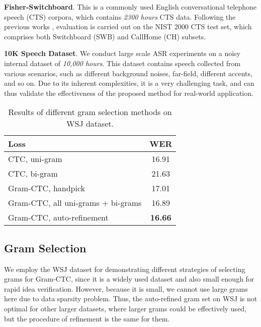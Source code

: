 \documentclass{article}
\begin{document}
{\bf Fisher-Switchboard}.  This is a commonly used English conversational telephone speech (CTS) corpora, which contains {\it 2300 hours} CTS data. Following the previous works \cite{geoffery2016ctc,povey2016purely,xiong2016achieving,sercu2016dense}, evaluation is carried out on the NIST 2000 CTS test set, which comprises both Switchboard (SWB) and CallHome (CH) subsets.

{\bf 10K Speech Dataset}. We conduct large scale ASR experiments on a noisy internal dataset of {\it 10,000 hours}. This dataset contains speech collected from various scenarios, such as different background noises, far-field, different accents, and so on. Due to its inherent complexities, it is a very challenging task, and can thus validate the effectiveness of the proposed method for real-world application.


\begin{table}[t]
\begin{center}
\begin{tabular}{l|c}
\toprule
Loss & WER \\
\midrule
CTC, uni-gram & 16.91 \\
CTC, bi-gram & 21.63 \\
\midrule
Gram-CTC, handpick & 17.01 \\
Gram-CTC, all uni-grams + bi-grams & 16.89 \\
Gram-CTC, auto-refinement & \textbf{16.66} \\
\bottomrule
\end{tabular}
\end{center}
\vspace{-10pt}
\caption{Results of different gram selection methods on WSJ dataset.}
\label{table:gram_selection}
\vspace{-10pt}
\end{table}


\subsection{Gram Selection}

\label{section:gram_selection}
We employ the WSJ dataset for demonstrating different strategies of selecting grams for Gram-CTC, since it is a widely used dataset and also small enough for rapid idea verification. However, because it is small, we cannot use large grams here due to data sparsity problem. Thus, the auto-refined gram set on WSJ is not optimal for other larger datasets, where larger grams could be effectively used, but the procedure of refinement is the same for them.
\end{document}
